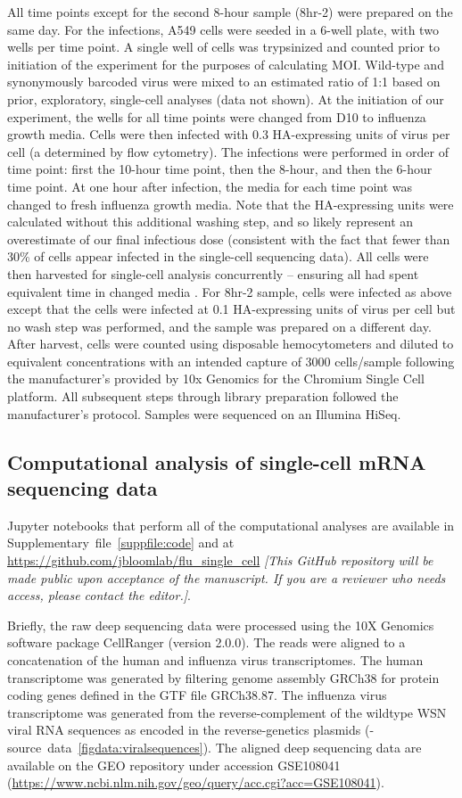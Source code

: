 \documentclass[9pt,lineno]{elife}
\newcommand{\jdbcomment}[1]{\emph{\color{red} [#1]}}
\begin{document}
All time points except for the second 8-hour sample (8hr-2) were prepared on the same day.
For the infections, A549 cells were seeded in a 6-well plate, with two wells per time point. 
A single well of cells was trypsinized and counted prior to initiation of the experiment for the purposes of calculating MOI.
Wild-type and synonymously barcoded virus were mixed to an estimated ratio of 1:1 based on prior, exploratory, single-cell analyses (data not shown). 
At the initiation of our experiment, the wells for all time points were changed from D10 to influenza growth media.
Cells were then infected with 0.3 HA-expressing units of virus per cell (a determined by flow cytometry).
The infections were performed in order of time point: first the 10-hour time point, then the 8-hour, and then the 6-hour time point.
At one hour after infection, the media for each time point was changed to fresh influenza growth media.
Note that the HA-expressing units were calculated without this additional washing step, and so likely represent an overestimate of our final infectious dose (consistent with the fact that fewer than 30\% of cells appear infected in the single-cell sequencing data).
All cells were then harvested for single-cell analysis concurrently -- ensuring all had spent equivalent time in changed media .
For 8hr-2 sample, cells were infected as above except that the cells were infected at 0.1 HA-expressing units of virus per cell but no wash step was performed, and the sample was prepared on a different day.
After harvest, cells were counted using disposable hemocytometers and diluted to equivalent concentrations with an intended capture of 3000 cells/sample following the manufacturer's provided by 10x Genomics for the Chromium Single Cell platform.
All subsequent steps through library preparation followed the manufacturer's protocol.
Samples were sequenced on an Illumina HiSeq. 

\subsection{Computational analysis of single-cell mRNA sequencing data}
Jupyter notebooks that perform all of the computational analyses are available in Supplementary~file~\ref{suppfile:code} and at \url{https://github.com/jbloomlab/flu_single_cell} \jdbcomment{This GitHub repository will be made public upon acceptance of the manuscript. If you are a reviewer who needs access, please contact the editor.}.

Briefly, the raw deep sequencing data were processed using the 10X Genomics software package CellRanger (version 2.0.0).
The reads were aligned to a concatenation of the human and influenza virus transcriptomes.
The human transcriptome was generated by filtering genome assembly GRCh38 for protein coding genes defined in the GTF file GRCh38.87.
The influenza virus transcriptome was generated from the reverse-complement of the wildtype WSN viral RNA sequences as encoded in the reverse-genetics plasmids (-source~data~\ref{figdata:viralsequences}).
The aligned deep sequencing data are available on the GEO repository under accession GSE108041 (\url{https://www.ncbi.nlm.nih.gov/geo/query/acc.cgi?acc=GSE108041}).
\end{document}
